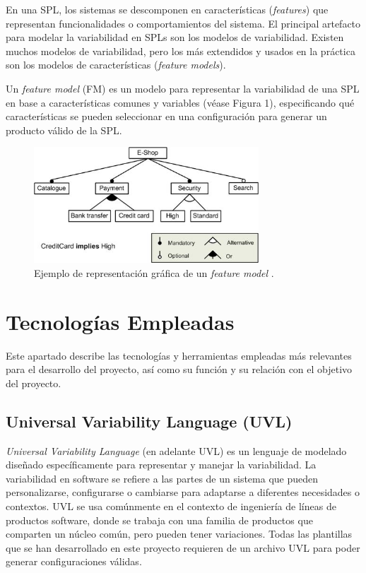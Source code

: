 \documentclass[12pt, a4paper, twoside]{article}
\begin{document}
En una SPL, los sistemas se descomponen en características (\emph{features}) que representan funcionalidades o comportamientos del sistema. 
El principal artefacto para modelar la variabilidad en SPLs son los modelos de variabilidad. Existen muchos modelos 
de variabilidad, pero los más extendidos y usados en la práctica son los modelos de características (\emph{feature models}). 

Un \emph{feature model} (FM) \cite{wikipedia_feature_model} es un modelo para representar la variabilidad de una SPL en base a características comunes y variables (véase Figura 1), especificando qué características se pueden seleccionar en una configuración para generar 
un producto válido de la SPL.  

\begin{figure}[ht]
	\centering
		\includegraphics[width=0.75\textwidth]{fm.example.jpg}
	\caption{Ejemplo de representación gráfica de un \emph{feature model} \cite{wikipedia_feature_model}.}
\end{figure}












\section{Tecnologías Empleadas}
\label{sec:Tecnologias Empleadas}
Este apartado describe las tecnologías y herramientas empleadas más relevantes para el desarrollo del proyecto, así como su función y su relación con el objetivo del proyecto.

\subsection{Universal Variability Language (UVL)}

\emph{Universal Variability Language} (en adelante UVL) \cite{uvl} es un lenguaje de modelado diseñado específicamente para representar y manejar la variabilidad. 
La variabilidad en software se refiere a las partes de un sistema que pueden personalizarse, configurarse o cambiarse para adaptarse a diferentes necesidades o contextos. 
UVL se usa comúnmente en el contexto de ingeniería de líneas de productos software, donde se trabaja con una familia de productos que comparten un núcleo común, pero pueden tener variaciones.
Todas las plantillas que se han desarrollado en este proyecto requieren de un archivo UVL para poder generar configuraciones válidas.
\end{document}
